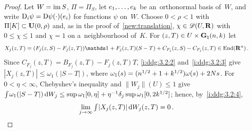 \documentclass[a4paper,twoside,leqno]{article}
\newcommand{\Gk}{\pgrass{\adim}{\vdim}}        %
\begin{document}
\begin{proof}
    Let $W = \operatorname{im} S$, $\Pi = \Pi_S$, let $e_1, \ldots, e_{k}$ be an~orthonormal basis of~$W$,
    and write $\mathrm{D}_i \psi = \mathrm{D} \psi(\cdot)(e_i)$ for functions $\psi$ on~$W$. Choose $0 < \rho <
    1$ with $\Pi[K] \subset \mathbf{U}(0,\rho)$ and, as in the proof of~\ref{new:translation}, $\chi
    \in \mathscr{D}(U,\mathbf{R})$ with $0 \le \chi \le 1$ and $\chi = 1$ on a~neighbourhood of~$K$. For $(z,T)
    \in U \times \Gk$ let
    \begin{displaymath}
        X_j(z,T) = (F_j(z,S) - F_j(z,T)) \id{} + F_j(z,T) (S - T) + C_{F_j}(z,S) - C_{F_j}(z,T) \in
        \End{\R^{\adim}} \,.
    \end{displaymath}
    Since $C_{F_j}(z,T) = B_{F_j}(z,T) - F_j(z,T) T$, \ref{i:ddg:3.2:2} and~\ref{i:ddg:3.2:3}
    give $|X_j(z,T)| \le \omega_1(|S - T|)$, where $\omega_1(s) = (n^{1/2} + 1 +
    k^{1/2}) \omega(s) + 2 N s$. For $0 < \eta < \infty$, Chebyshev's inequality and
    $\|W_j\|(U) \le 1$ give ${\textstyle\int_{}^{}} \omega_1(|S - T|) \,\mathrm{d} W_j \le \sup \omega_1[0,\eta] +
    \eta^{-1} \delta_j \sup \omega_1[0, 2 k^{1/2}]$; hence, by~\ref{i:ddg:3.2:4},
    \begin{equation}
        \label{eq:ddg:3.2:1}
        \lim_{j \to \infty} {\textstyle\int_{}^{}} |X_j(z,T)| \,\mathrm{d} W_j(z,T) = 0 \,.
    \end{equation}


\end{proof}
\end{document}
